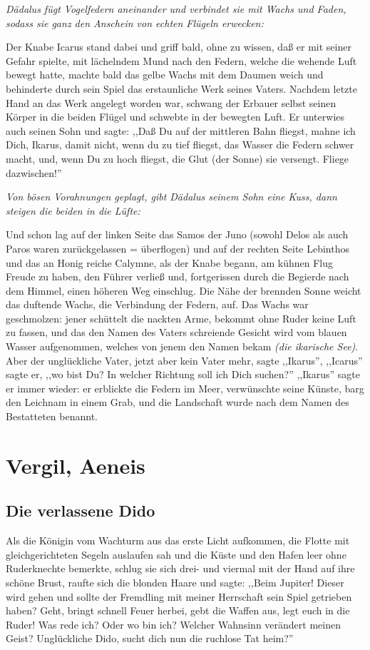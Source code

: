 \documentclass[a4paper]{article}
\begin{document}
\textit{Dädalus fügt Vogelfedern aneinander und verbindet sie mit Wachs und Faden, sodass sie ganz den Anschein von echten Flügeln erwecken:}

Der Knabe Icarus stand dabei und griff bald, ohne zu wissen, daß er mit seiner Gefahr spielte, mit lächelndem Mund nach den Federn, welche die wehende Luft bewegt hatte, machte bald das gelbe Wachs mit dem Daumen weich und behinderte durch sein Spiel das erstaunliche Werk seines Vaters. Nachdem letzte Hand an das Werk angelegt worden war, schwang der Erbauer selbst seinen Körper in die beiden Flügel und schwebte in der bewegten Luft. Er unterwies auch seinen Sohn und sagte: ,,Daß Du auf der mittleren Bahn fliegst, mahne ich Dich, Ikarus, damit nicht, wenn du zu tief fliegst, das Wasser die Federn schwer macht, und, wenn Du zu hoch fliegst, die Glut (der Sonne) sie versengt. Fliege dazwischen!''

\textit{Von bösen Vorahnungen geplagt, gibt Dädalus seinem Sohn eine Kuss, dann steigen die beiden in die Lüfte:}

Und schon lag auf der linken Seite das Samos der Juno (sowohl Delos als auch Paros waren zurückgelassen = überflogen) und auf der rechten Seite Lebinthos und das an Honig reiche Calymne, als der Knabe begann, am kühnen Flug Freude zu haben, den Führer verließ und, fortgerissen durch die Begierde nach dem Himmel, einen höheren Weg einschlug. Die Nähe der brennden Sonne weicht das duftende Wachs, die Verbindung der Federn, auf. Das Wachs war geschmolzen: jener schüttelt die nackten Arme, bekommt ohne Ruder keine Luft zu fassen, und das den Namen des Vaters schreiende Gesicht wird vom blauen Wasser aufgenommen, welches von jenem den Namen bekam \textit{(die ikarische See)}. Aber der unglückliche Vater, jetzt aber kein Vater mehr, sagte ,,Ikarus'', ,,Icarus'' sagte er, ,,wo bist Du? In welcher Richtung soll ich Dich suchen?'' ,,Ikarus'' sagte er immer wieder: er erblickte die Federn im Meer, verwünschte seine Künste, barg den Leichnam in einem Grab, und die Landschaft wurde nach dem Namen des Bestatteten benannt.

\section{Vergil, Aeneis}
\subsection{Die verlassene Dido}
Als die Königin vom Wachturm aus das erste Licht aufkommen, die Flotte mit gleichgerichteten Segeln auslaufen sah und die Küste und den Hafen leer ohne Ruderknechte bemerkte, schlug sie sich drei- und viermal mit der Hand auf ihre schöne Brust, raufte sich die blonden Haare und sagte: ,,Beim Jupiter! Dieser wird gehen und sollte der Fremdling mit meiner Herrschaft sein Spiel getrieben haben? Geht, bringt schnell Feuer herbei, gebt die Waffen aus, legt euch in die Ruder! Was rede ich? Oder wo bin ich? Welcher Wahnsinn verändert meinen Geist? Unglückliche Dido, sucht dich nun die ruchlose Tat heim?''
\end{document}
